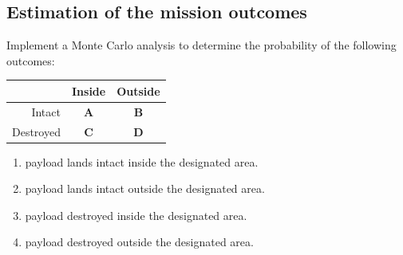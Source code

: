\documentclass[11pt]{article}
\begin{document}
\subsection{Estimation of the mission outcomes}
Implement a Monte Carlo analysis to determine the probability of the following outcomes:\\[0.5em]
\begin{minipage}{0.4\linewidth}
\begin{center}
  {\def\arraystretch{1.5}
  \begin{tabular}{r|c|c}
    & Inside & Outside \\ \hline
    Intact & \textbf{A} & \textbf{B} \\ \hline
    Destroyed & \textbf{C} & \textbf{D} \\
  \end{tabular}
  }
\end{center}
\end{minipage}
\begin{minipage}{0.6\linewidth}
\begin{enumerate}[label=\textbf{\Alph*:}]
  \item payload lands intact inside the designated area.
  \item payload lands intact outside the designated area.
  \item payload destroyed inside the designated area.
  \item payload destroyed outside the designated area.
\end{enumerate}
\end{minipage}
\end{document}
